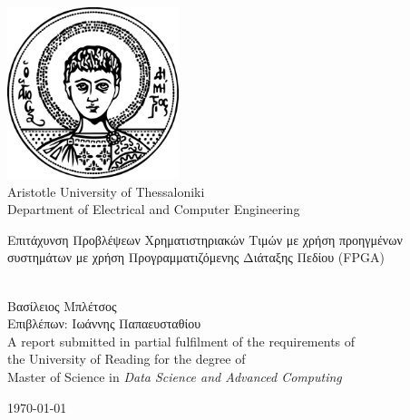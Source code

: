 \documentclass[a4paper,11pt,oneside]{book}
\begin{document}
    
    \frontmatter
    
    \begin{titlepage}      
        \begin{center}
            \includegraphics[width=5cm]{figures/auth_logo.png}\\[0.8cm]
            {\LARGE Aristotle University of Thessaloniki\\[0.5cm]
            Department of Electrical and Computer Engineering}\\[2cm]		%
			
            \linespread{1.2}\huge {
                Επιτάχυνση Προβλέψεων Χρηματιστηριακών Τιμών με χρήση προηγμένων συστημάτων
                με χρήση Προγραμματιζόμενης Διάταξης Πεδίου (FPGA)
            
            }
            \linespread{1}~\\[2cm]
            {\Large 
                Βασίλειος Μπλέτσος        
            }\\[1cm] 
            

            {\large 
                Επιβλέπων: Ιωάννης Παπαευσταθίου
            }\\[1cm] 
            
            \large A report submitted in partial fulfilment of the requirements of\\the University of Reading for the degree of\\
            Master of Science 
            in \textit{Data Science and Advanced Computing}\\[0.3cm] 
            \vfill
            
            
            \today %
        \end{center}
    \end{titlepage}
     
\end{document}
